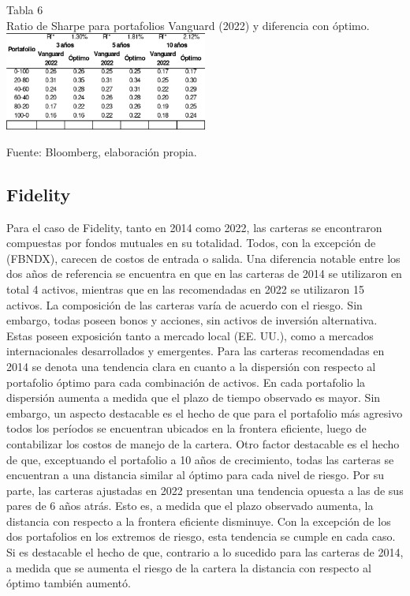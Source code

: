 \documentclass[a4paper,fleqn]{cas-sc}
\begin{document}
\newpage
\begin{center}
    Tabla 6\\
    Ratio de Sharpe para portafolios Vanguard (2022) y diferencia con óptimo.\\

    \includegraphics[width=0.5\textwidth]{image/tabla6.png}

    \tiny Fuente: Bloomberg, elaboración propia.
\end{center}

\subsection{Fidelity}
Para el caso de Fidelity, tanto en 2014 como 2022, las carteras se encontraron compuestas por fondos mutuales en su totalidad. Todos, con la excepción de (FBNDX), carecen de costos de entrada o salida. 
Una diferencia notable entre los dos años de referencia se encuentra en que en las carteras de 2014 se utilizaron en total 4 activos, mientras que en las recomendadas en 2022 se utilizaron 15 activos. 
La composición de las carteras varía de acuerdo con el riesgo. Sin embargo, todas poseen bonos y acciones, sin activos de inversión alternativa. Estas poseen exposición tanto a mercado local (EE. UU.), como a mercados internacionales desarrollados y emergentes. 
Para las carteras recomendadas en 2014 se denota una tendencia clara en cuanto a la dispersión con respecto al portafolio óptimo para cada combinación de activos. En cada portafolio la dispersión aumenta a medida que el plazo de tiempo observado es mayor. Sin embargo, un aspecto destacable es el hecho de que para el portafolio más agresivo todos los períodos se encuentran ubicados en la frontera eficiente, luego de contabilizar los costos de manejo de la cartera. Otro factor destacable es el hecho de que, exceptuando el portafolio a 10 años de crecimiento, todas las carteras se encuentran a una distancia similar al óptimo para cada nivel de riesgo. 
Por su parte, las carteras ajustadas en 2022 presentan una tendencia opuesta a las de sus pares de 6 años atrás. Esto es, a medida que el plazo observado aumenta, la distancia con respecto a la frontera eficiente disminuye. Con la excepción de los dos portafolios en los extremos de riesgo, esta tendencia se cumple en cada caso. Si es destacable el hecho de que, contrario a lo sucedido para las carteras de 2014, a medida que se aumenta el riesgo de la cartera la distancia con respecto al óptimo también aumentó.
\end{document}
